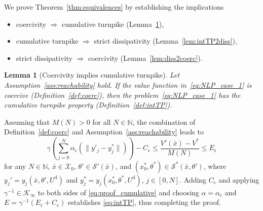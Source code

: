 \documentclass[a4paper,fleqn]{cas-dc}
\newtheorem{lem}{Lemma}
\begin{document}
We prove Theorem~\ref{thm:equivalences} by establishing the implications
\begin{itemize}
	\itemsep=-0.4ex
	\item coercivity $\Rightarrow$ cumulative turnpike (Lemma~\ref{lem:coerc2intTP}),
	\item cumulative turnpike $\Rightarrow$ strict dissipativity (Lemma~\ref{lem:intTP2diss}),
	\item strict dissipativity $\Rightarrow$ coercivity (Lemma~\ref{lem:diss2coerc}).
\end{itemize}

\begin{lem}[Coercivity implies cumulative turnpike]\label{lem:coerc2intTP}
	Let Assumption~\ref{ass:reachability} hold. If the value function in~\eqref{eq:NLP_case_1} is coercive (Definition~\ref{def:coerc}), then the problem~\eqref{eq:NLP_case_1} has the cumulative turnpike property (Definition~\ref{def:intTP}).
\end{lem}
\begin{pf}
	Assuming that $M(N)>0$ for all $N\in\mathbb{N}$, the combination of Definition~\ref{def:coerc} and Assumption~\ref{ass:reachability} leads to
	\begin{equation}\label{eq:proof_cumulative}
		\gamma\left(\sum_{j=0}^{N} \alpha_\mathrm{c}(\|y'_j-y^*_j\|)\right) - C_\mathrm{c} \leq \frac{V'(\bar{x}) - V^*}{M(N)} \leq E_\mathrm{r}
	\end{equation}
	for any $N\in\mathbb{N}$, $\bar{x}\in\mathcal{X}_0$, $\theta'\in\mathcal{S}'(\bar{x})$, and $(x_0^*,\theta^*)\in\mathcal{S}^*(\bar{x},\theta')$, where $y_j'=y_j(\bar{x},\theta',U^\mathrm{d})$ and $y^*_j=y_j(x_0^*,\theta^*,U^\mathrm{d})$, $j\in[0,N]$.
	Adding $C_\mathrm{c}$ and applying $\gamma^{-1}\in\mathcal{K}_\infty$ to both sides of \eqref{eq:proof_cumulative} and choosing $\alpha=\alpha_\mathrm{c}$ and $E = \gamma^{-1}(E_\mathrm{r}+C_\mathrm{c})$ establishes \eqref{eq:intTP}, thus completing the proof.
\end{pf}
\end{document}

